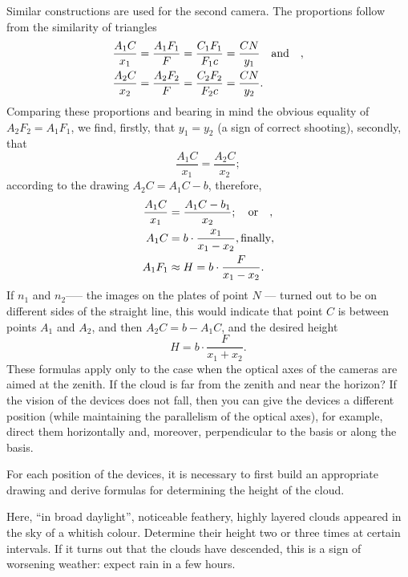 Similar constructions are used for the second camera. The proportions follow from the similarity of triangles
\begin{align*}%
\frac{A_{1}C}{x_{1}} & = \frac{A_{1}F_{1}}{F} = \frac{C_{1}F_{1}}{F_{1}c} = \frac{CN}{y_{1}} \qand ,\\
\frac{A_{2}C}{x_{2}} & = \frac{A_{2}F_{2}}{F} = \frac{C_{2}F_{2}}{F_{2}c} = \frac{CN}{y_{2}}.
\end{align*}
Comparing these proportions and bearing in mind the obvious equality of $A_{2}F_{2} = A_{1}F_{1}$, we find, firstly, that $y_{1} = y_{2}$ (a sign of correct shooting), secondly, that
\begin{equation*}%
\frac{A_{1}C}{x_{1}} = \frac{A_{2}C}{x_{2}};
\end{equation*}	
according to the drawing $A_{2}C = A_{1}C - b$, therefore,
\begin{align*}%
\frac{A_{1}C}{x_{1}} & = \frac{A_{1}C - b_{1}}{x_{2}}; \qor , \\
A_{1}C & = b \cdot \frac{x_{1}}{x_{1} - x_{2}}, \text{finally},\\
A_{1}F_{1} & \approx  H = b \cdot \frac{F}{x_{1} - x_{2}}.
\end{align*}	
If $n_{1}$ and $n_{2}$--— the images on the plates of point $N$ — turned out to be on different sides of the straight line, this would indicate that point $C$ is between points $A_{1}$ and $A_{2}$, and then $A_{2}C = b - A_{1}C$, and the desired height
\begin{equation*}%
 H = b \cdot \frac{F}{x_{1} + x_{2}}.
\end{equation*}
These formulas apply only to the case when the optical axes of the cameras are aimed at the zenith. If the cloud is far from the zenith and near the horizon? If the vision of the devices does not fall, then you can give the devices a different position (while maintaining the parallelism of the optical axes), for example, direct them horizontally and, moreover, perpendicular to the basis or along the basis. 

For each position of the devices, it is necessary to first build an appropriate drawing and derive formulas for determining the height of the cloud.

\ques Here, ``in broad daylight'', noticeable feathery, highly layered clouds appeared in the sky of a whitish colour. Determine their height two or three times at certain intervals. If it turns out that the clouds have descended, this is a sign of worsening weather: expect rain in a few hours.

